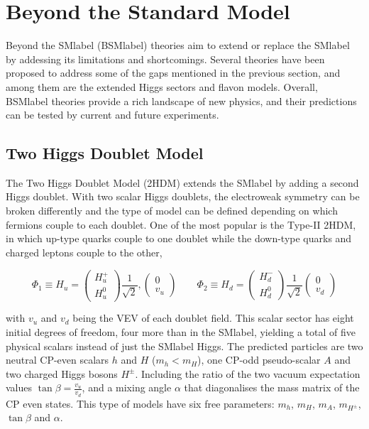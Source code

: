 \section{Beyond the Standard Model}

Beyond the \acrshort{SMlabel} (\acrshort{BSMlabel}) theories aim to extend or replace the \acrshort{SMlabel} by addessing its limitations and shortcomings. Several theories have been proposed to address some of the gaps mentioned in the previous section, and among them are the extended Higgs sectors and flavon models. Overall, \acrshort{BSMlabel} theories provide a rich landscape of new physics, and their predictions can be tested by current and future experiments.\\

\subsection{Two Higgs Doublet Model}

The Two Higgs Doublet Model (2HDM) extends the \acrshort{SMlabel} by adding a second Higgs doublet. With two scalar Higgs doublets, the electroweak symmetry can be broken differently and the type of model can be defined depending on which fermions couple to each doublet. One of the most popular is the Type-II 2HDM, in which up-type quarks couple to one doublet while the down-type quarks and charged leptons couple to the other,

\begin{equation}
    \Phi_1\equiv H_u = 
    \begin{pmatrix} H^+_u \\ H^0_u \end{pmatrix}
    \frac{1}{\sqrt{2}},
    \begin{pmatrix} 0 \\ v_u \end{pmatrix}
    \qquad
    \Phi_2\equiv H_d = 
    \begin{pmatrix} H^-_d \\ H^0_d \end{pmatrix}
    \frac{1}{\sqrt{2}}
    \begin{pmatrix} 0 \\ v_d \end{pmatrix}
\end{equation}

with $v_u$ and $v_d$ being the \acrshort{VEV} of each doublet field. This scalar sector has eight initial degrees of freedom, four more than in the \acrshort{SMlabel}, yielding a total of five physical scalars instead of just the \acrshort{SMlabel} Higgs. The predicted particles are two neutral CP-even scalars $h$ and $H$ ($m_h < m_H$), one CP-odd pseudo-scalar $A$ and two charged Higgs bosons $H^\pm$. Including the ratio of the two vacuum expectation values $\tan\beta=\frac{v_u}{v_d}$, and a mixing angle $\alpha$ that diagonalises the mass matrix of the CP even states. This type of models have six free parameters: $m_h$, $m_H$, $m_A$, $m_{H^\pm}$, $\tan\beta$ and $\alpha$.

